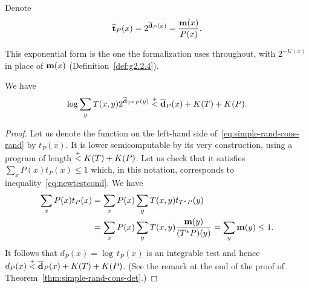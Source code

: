  \begin{definition}
  \label{def:g2.2.7}
  \leanok
Denote
 \begin{align}\label{eq:e.ol-t}
    \overline{\mathbf{t}}_{P}(x) = 2^{\overline{\mathbf{d}}_{P}(x)}=\frac{\mathbf{m}(x)}{P(x)}.
  \end{align}
 \end{definition}

\begin{formalization}
This exponential form is the one the formalization uses throughout, with \( 2^{-K(x)} \) in
place of \( \mathbf{m}(x) \) (Definition~\ref{def:g2.2.4}).
\end{formalization}

 \begin{theorem}
  \label{thm:g2.2.3}
  \leanok
 We have
 \begin{equation}\label{eq:simple-rand-cons-rand}
 \log \sum_{y} T(x, y) 2^{\overline{\mathbf{d}}_{T^{*} P}(y)} \stackrel{{}_+}{<} \overline{\mathbf{d}}_{P}(x) + K(T) + K(P).
 \end{equation}
 \end{theorem}
 \begin{proof}
  \leanok
Let us denote the function on the left-hand side
of~\eqref{eq:simple-rand-cons-rand} by $t_{P}(x)$.
It is lower semicomputable by its very construction, using a program of
length $\stackrel{{}_+}{<} K(T) + K(P)$.
Let us check that it satisfies $\sum_{x} P(x) t_{P}(x) \le 1$ which,
in this notation, corresponds to inequality~\eqref{eq:newtestcond}.
We have
 \begin{align*}
   \sum_{x} P(x) t_{P}(x) &= \sum_{x} P(x) \sum_{y} T(x, y) t_{T^{*} P}(y)
\\   &= \sum_{x} P(x) \sum_{y} T(x, y) \frac{\mathbf{m}(y)}{(T^{*}P)(y)}
      = \sum_{y} \mathbf{m}(y) \le 1.
 \end{align*}
It follows that $d_{P}(x) = \log\, t_{P}(x)$ is an integrable
test and hence $d_{P}(x) \stackrel{{}_+}{<} \overline{\mathbf{d}}_{P}(x) + K(T) + K(P)$.
(See the remark at the end of the proof of
Theorem~\ref{thm:simple-rand-cons-det}.)
 \end{proof}

